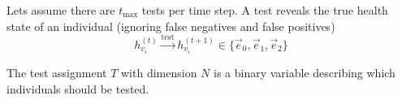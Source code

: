 Lets assume there are $t_{\text{max}}$ tests per time step.
A test reveals the true health state of an individual (ignoring false negatives and false positives)
\begin{equation}
h_{{v}_i}^{(t)} \xrightarrow{\text{test}} h_{{v}_i}^{(t+1)} \in \{\vec{e}_0, \vec{e}_1, \vec{e}_2 \}
\end{equation}

The test assignment $T$ with dimension $N$ is a binary variable describing which individuals should be tested.